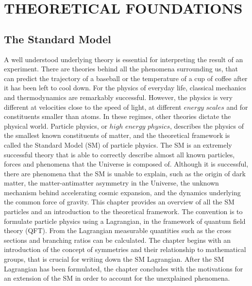 \part{THEORETICAL FOUNDATIONS}
\noindent\justify
\chapter{The Standard Model} \label{sec:theory}
\noindent\justify
A well understood underlying theory is essential for interpreting the result of an experiment.
There are theories behind all the phenomena surrounding us, that can predict the trajectory of a baseball or the temperature of a cup of coffee after it has been left to cool down. 
For the physics of everyday life, classical mechanics and thermodynamics are remarkably successful. 
However, the physics is very different at velocities close to the speed of light, at different $energy$ $scales$ and for constituents smaller than atoms.
In these regimes, other theories dictate the physical world. 
Particle physics, or $high$ $energy$ $physics$, describes the physics of the smallest known constituents of matter, and the theoretical framework is called the Standard Model (SM) of particle physics.
The SM is an extremely successful theory that is able to correctly describe almost all known particles, forces and phenomena that the Universe is composed of. 
Although it is successful, there are phenomena that the SM is unable to explain, such as the origin of dark matter, the matter-antimatter asymmetry in the Universe, the unknown mechanism behind accelerating cosmic expansion, and the dynamics underlying the common force of gravity.
\newpara
\noindent\justify
This chapter provides an overview of all the SM particles and an introduction to the theoretical framework. 
The convention is to formulate particle physics using a Lagrangian, in the framework of quantum field theory (QFT). 
From the Lagrangian measurable quantities such as the cross sections and branching ratios can be calculated. 
The chapter begins with an introduction of the concept of symmetries and their relationship to mathematical groups, that is crucial for writing down the SM Lagrangian.
After the SM Lagrangian has been formulated, the chapter concludes with the motivations for an extension of the SM in order to account for the unexplained phenomena.
\newpage
